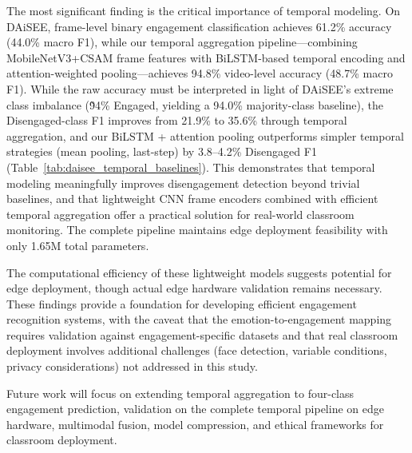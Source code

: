 \documentclass[sensors,article,submit,pdftex,moreauthors]{Definitions/mdpi}
\begin{document}
The most significant finding is the critical importance of temporal modeling. On DAiSEE, frame-level binary engagement classification achieves 61.2\% accuracy (44.0\% macro F1), while our temporal aggregation pipeline---combining MobileNetV3+CSAM frame features with BiLSTM-based temporal encoding and attention-weighted pooling---achieves 94.8\% video-level accuracy (48.7\% macro F1). While the raw accuracy must be interpreted in light of DAiSEE's extreme class imbalance (\~94\% Engaged, yielding a 94.0\% majority-class baseline), the Disengaged-class F1 improves from 21.9\% to 35.6\% through temporal aggregation, and our BiLSTM + attention pooling outperforms simpler temporal strategies (mean pooling, last-step) by 3.8--4.2\% Disengaged F1 (Table~\ref{tab:daisee_temporal_baselines}). This demonstrates that temporal modeling meaningfully improves disengagement detection beyond trivial baselines, and that lightweight CNN frame encoders combined with efficient temporal aggregation offer a practical solution for real-world classroom monitoring. The complete pipeline maintains edge deployment feasibility with only 1.65M total parameters.

The computational efficiency of these lightweight models suggests potential for edge deployment, though actual edge hardware validation remains necessary. These findings provide a foundation for developing efficient engagement recognition systems, with the caveat that the emotion-to-engagement mapping requires validation against engagement-specific datasets and that real classroom deployment involves additional challenges (face detection, variable conditions, privacy considerations) not addressed in this study.

Future work will focus on extending temporal aggregation to four-class engagement prediction, validation on the complete temporal pipeline on edge hardware, multimodal fusion, model compression, and ethical frameworks for classroom deployment.

\vspace{6pt}


\end{document}
